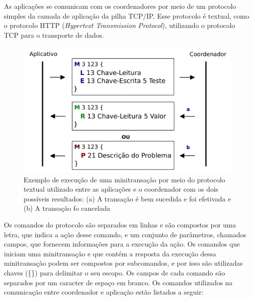 \documentclass[11pt,twoside,a4paper]{book}
\begin{document}
As aplicações se comunicam com os coordenadores por meio de um protocolo simples da camada de aplicação da pilha TCP/IP. Esse protocolo é textual, como o protocolo HTTP (\emph{Hypertext Transmission Protocol}), utilizando o protocolo TCP para o transporte de dados. 

\begin{figure}
  \centering
  \includegraphics[width=.80\textwidth]{protocolo} 
  \caption{Exemplo de execução de uma minitransação por meio do protocolo textual utilizado entre as aplicações e o coordenador com os dois possíveis resultados: (a) A transação é bem sucedida e foi efetivada e (b) A transação fo cancelada}
  \label{fig:protocolo} 
\end{figure}

Os comandos do protocolo são separados em linhas e são compostos por uma letra, que indica a ação desse comando, e um conjunto de parâmetros, chamados campos, que fornecem informações para a execução da ação. Os comandos que iniciam uma minitransação e que contém a resposta da execução dessa minitransação podem ser compostos por subcomandos, e por isso são utilizadas chaves (\{\}) para delimitar o seu escopo. Os campos de cada comando são separados por um caracter de espaço em branco. Os comandos utilizados na comunicação entre coordenador e aplicação estão listados a seguir:
\end{document}
